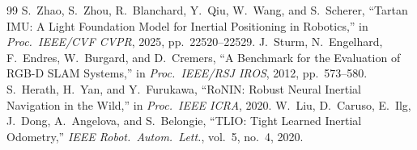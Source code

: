 \documentclass[letterpaper,10pt,conference]{ieeeconf}
\begin{document}
\begin{thebibliography}{99}
S.~Zhao, S.~Zhou, R.~Blanchard, Y.~Qiu, W.~Wang, and S.~Scherer, ``Tartan IMU: A Light Foundation Model for Inertial
Positioning in Robotics,'' in \emph{Proc.\ IEEE/CVF CVPR}, 2025, pp.~22520--22529.
J.~Sturm, N.~Engelhard, F.~Endres, W.~Burgard, and D.~Cremers, ``A Benchmark for the Evaluation of RGB-D SLAM
Systems,'' in \emph{Proc.\ IEEE/RSJ IROS}, 2012, pp.~573--580.
S.~Herath, H.~Yan, and Y.~Furukawa, ``RoNIN: Robust Neural Inertial Navigation in the Wild,'' in \emph{Proc.\ IEEE
ICRA}, 2020.
W.~Liu, D.~Caruso, E.~Ilg, J.~Dong, A.~Angelova, and S.~Belongie, ``TLIO: Tight Learned Inertial Odometry,''
\emph{IEEE Robot.\ Autom.\ Lett.}, vol.~5, no.~4, 2020.
\end{thebibliography}
\end{document}
